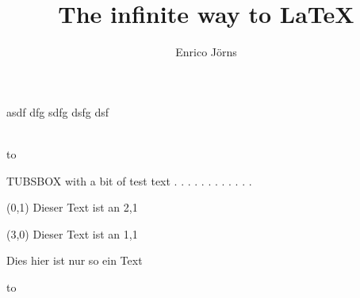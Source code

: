 \documentclass[a5paper,portrait]{scrreprt}
\renewcommand{\maketitle}{%
\setlength{\fboxsep}{0cm}%
\colorbox{tuSecondaryLight}{%
  \begin{minipage}[t][\textheight]{\textwidth}%
      \LARGE asdf dfg sdfg dsfg dsf
  \end{minipage}%
}
\vspace*{-0.75\tulogoHeight}\vspace{-\textheight}\\%
\hspace*{-5.5mm}%
\colorbox{tuRed}{%
\hbox to \tulogoWidth{\vbox to \tulogoHeight{\tubslogo}}%
}\vspace*{-0.25\tulogoHeight}\\%
}
\begin{document}
\author{Enrico Jörns}
\title{The infinite way to LaTeX}

\maketitle

\newpage

\begin{tubsbox}[tuBlueLight40]{0}{2}{3}{4}
  TUBSBOX with a bit of test text . . . . . . . . . . . .
\end{tubsbox}


\begin{textblock}{3}(0,1)
Dieser Text ist an 2,1
\end{textblock}

\begin{textblock}{3}(3,0)
Dieser Text ist an 1,1
\end{textblock}


Dies hier ist nur so ein Text

\newpage


\newpage

\setlength{\fboxsep}{0cm}%
\colorbox{tuSecondaryLight}{%
\parbox{\textwidth}{\vbox to }%
}
\end{document}
